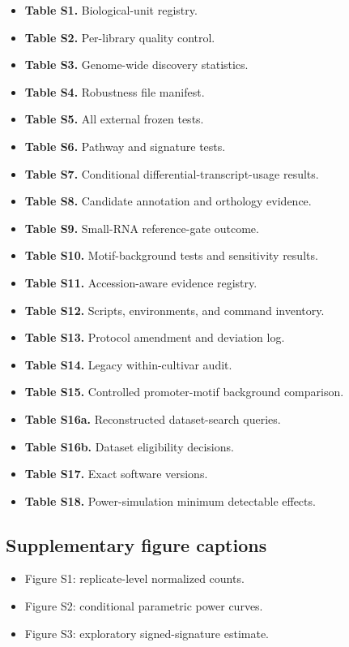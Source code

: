 \documentclass[12pt]{article}
\begin{document}
\begin{itemize}
\item \textbf{Table S1.} Biological-unit registry.
\item \textbf{Table S2.} Per-library quality control.
\item \textbf{Table S3.} Genome-wide discovery statistics.
\item \textbf{Table S4.} Robustness file manifest.
\item \textbf{Table S5.} All external frozen tests.
\item \textbf{Table S6.} Pathway and signature tests.
\item \textbf{Table S7.} Conditional differential-transcript-usage results.
\item \textbf{Table S8.} Candidate annotation and orthology evidence.
\item \textbf{Table S9.} Small-RNA reference-gate outcome.
\item \textbf{Table S10.} Motif-background tests and sensitivity results.
\item \textbf{Table S11.} Accession-aware evidence registry.
\item \textbf{Table S12.} Scripts, environments, and command inventory.
\item \textbf{Table S13.} Protocol amendment and deviation log.
\item \textbf{Table S14.} Legacy within-cultivar audit.
\item \textbf{Table S15.} Controlled promoter-motif background comparison.
\item \textbf{Table S16a.} Reconstructed dataset-search queries.
\item \textbf{Table S16b.} Dataset eligibility decisions.
\item \textbf{Table S17.} Exact software versions.
\item \textbf{Table S18.} Power-simulation minimum detectable effects.
\end{itemize}

\subsection*{Supplementary figure captions}

\begin{itemize}
\item Figure S1: replicate-level normalized counts.
\item Figure S2: conditional parametric power curves.
\item Figure S3: exploratory signed-signature estimate.
\end{itemize}
\end{document}
